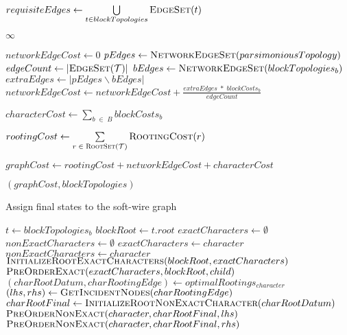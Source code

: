 \documentclass[12pt]{article}
\begin{document}
{\begin{algorithm}
\begin{algorithmic}[1]
		\State $requisiteEdges \gets \bigcup\limits_{t \in blockTopologies} \Call{EdgeSet}{t}$
		
		   \State \Return $\infty$
		\EndIf
		
		\State $networkEdgeCost \gets 0$
		\State $pEdges \gets \Call{NetworkEdgeSet}{parsimoniousTopology}$
		\State $edgeCount \gets |\Call{EdgeSet}{\mathcal{T}}|$
		  \State $bEdges \gets \Call{NetworkEdgeSet}{blockTopologies_b}$
		  \State $extraEdges \gets |pEdges \backslash bEdges |$
		  \State $networkEdgeCost \gets networkEdgeCost + \frac{extraEdges \;*\; blockCosts_b}{edgeCount}$
		\EndFor
		
		\State $characterCost \gets \sum\limits_{b\; \in\; B} blockCosts_{b}$
		
		\State $rootingCost \gets \sum\limits_{r\; \in\; \Call{RootSet}{\mathcal{T}}} \Call{RootingCost}{r}$
		
		\State $graphCost \gets rootingCost + networkEdgeCost + characterCost$

		\State \Return $(graphCost, blockTopologies)$
		\EndFunction
	\end{algorithmic}
\end{algorithm}


\begin{algorithm}
	\caption{Assign final states to the soft-wire graph}
	\label{Alg:pre-order-traversal}
	\begin{algorithmic}[1]
		
		  \State $t \gets blockTopologies_{b}$
		  \State $blockRoot \gets t.root$
		  \State $exactCharacters \gets \emptyset$
		  \State $nonExactCharacters \gets \emptyset$
		      \State $exactCharacters \gets character$
		    \Else
		      \State $nonExactCharacters \gets character$
		    \EndIf
		  \EndFor
		  \State $\Call{InitializeRootExactCharacters}{blockRoot, exactCharacters}$
		    \State $\Call{PreOrderExact}{exactCharacters, blockRoot, child}$
		  \EndFor
		    \State $(charRootDatum, charRootingEdge) \gets optimalRootings_{character}$
		    \State $(lhs, rhs) \gets \Call{GetIncidentNodes}{charRootingEdge}$
		    \State $charRootFinal \gets \Call{InitializeRootNonExactCharacter}{charRootDatum}$
		    \State $\Call{PreOrderNonExact}{character, charRootFinal, lhs}$
		    \State $\Call{PreOrderNonExact}{character, charRootFinal, rhs}$
		  \EndFor


\end{algorithmic}
\end{algorithm}}
\end{document}

